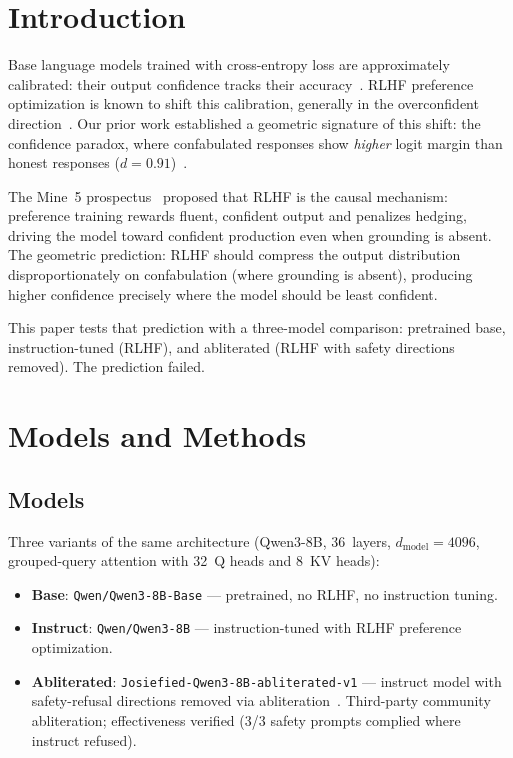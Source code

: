 \documentclass[11pt,a4paper]{article}
\begin{document}
\section{Introduction}
\label{sec:intro}

Base language models trained with cross-entropy loss are approximately
calibrated: their output confidence tracks their accuracy~\citep{kadavath2022language}.
RLHF preference optimization is known to shift this calibration,
generally in the overconfident direction~\citep{openai2023gpt4}.
Our prior work established a geometric signature of this shift: the
confidence paradox, where confabulated responses show \emph{higher}
logit margin than honest responses ($d{=}0.91$)~\citep{lyra2026decision}.

The Mine~5 prospectus~\citep{lyra2026mine5} proposed that RLHF is
the causal mechanism: preference training rewards fluent, confident
output and penalizes hedging, driving the model toward confident
production even when grounding is absent. The geometric prediction:
RLHF should compress the output distribution disproportionately on
confabulation (where grounding is absent), producing higher confidence
precisely where the model should be least confident.

This paper tests that prediction with a three-model comparison:
pretrained base, instruction-tuned (RLHF), and abliterated
(RLHF with safety directions removed). The prediction failed.

\section{Models and Methods}
\label{sec:methods}

\subsection{Models}

Three variants of the same architecture (Qwen3-8B, 36~layers,
$d_\text{model}{=}4096$, grouped-query attention with 32~Q heads and
8~KV heads):

\begin{itemize}[nosep]
\item \textbf{Base}: \texttt{Qwen/Qwen3-8B-Base} --- pretrained,
  no RLHF, no instruction tuning.
\item \textbf{Instruct}: \texttt{Qwen/Qwen3-8B} --- instruction-tuned
  with RLHF preference optimization.
\item \textbf{Abliterated}: \texttt{Josiefied-Qwen3-8B-abliterated-v1}
  --- instruct model with safety-refusal directions removed via
  abliteration~\citep{arditi2024refusal}. Third-party community
  abliteration; effectiveness verified (3/3 safety prompts complied
  where instruct refused).
\end{itemize}
\end{document}
